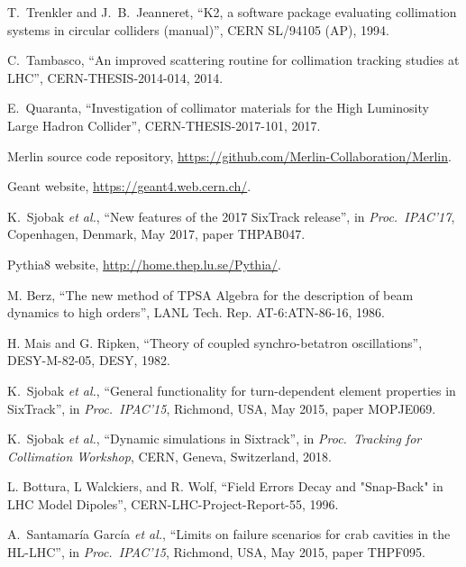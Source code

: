 \documentclass{ws-ijmpa}
\begin{document}
\begin{thebibliography}{99}
T.~Trenkler and J.~B.~Jeanneret,
``K2, a software package evaluating collimation systems in circular colliders (manual)'',
CERN SL/94105 (AP), 1994.

C.~Tambasco,
``An improved scattering routine for collimation tracking studies at LHC'',
CERN-THESIS-2014-014, 2014.

E.~Quaranta,
``Investigation of collimator materials for the High Luminosity Large Hadron Collider'',
CERN-THESIS-2017-101, 2017.

Merlin source code repository,
\url{https://github.com/Merlin-Collaboration/Merlin}.

Geant website,
\url{https://geant4.web.cern.ch/}.

K.~Sjobak \emph{et al.},
``New features of the 2017 SixTrack release'',
in \emph{Proc.~IPAC'17}, Copenhagen, Denmark, May 2017, paper THPAB047.

Pythia8 website,
\url{http://home.thep.lu.se/Pythia/}.

M. Berz,
``The new method of TPSA Algebra for the description of beam dynamics to high orders'',
LANL Tech. Rep. AT-6:ATN-86-16, 1986.

H. Mais and G. Ripken,
``Theory of coupled synchro-betatron oscillations'',
DESY-M-82-05, DESY, 1982.

K.\ Sjobak {\it et al.}, ``General functionality for turn-dependent element properties in SixTrack'', in \textit{Proc.~IPAC'15}, Richmond, USA, May 2015, paper MOPJE069.

K.\ Sjobak {\it et al.},
``Dynamic simulations in Sixtrack'', in \emph{Proc.~Tracking for Collimation Workshop}, CERN, Geneva, Switzerland, 2018.

L. Bottura, L Walckiers, and R. Wolf, ``Field Errors Decay and "Snap-Back" in LHC Model Dipoles'', CERN-LHC-Project-Report-55, 1996.

A.~Santamaría García {\it et al.},
``Limits on failure scenarios for crab cavities in the HL-LHC'',
in {\it Proc.~IPAC’15}, Richmond, USA, May 2015, paper THPF095.


\end{thebibliography}
\end{document}
